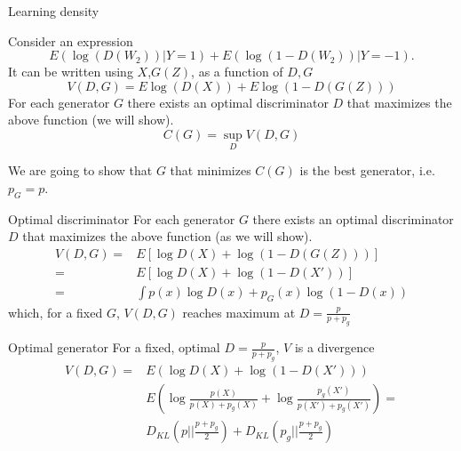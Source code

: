 \documentclass{beamer}
\begin{document}
  
\begin{frame}{Learning density}

Consider an expression  
$$
E \left( \log(D(W_2)) | Y=1 \right)  + E \left( \log(1 - D(W_2))| Y=-1  \right).
$$
It can be written using $X$,$G(Z)$, as a function of $D,G$
$$
V(D,G) = E \log(D(X)) + E \log(1 - D(G(Z)))
$$
For each generator  $G$ there exists an optimal  discriminator $D$ that maximizes the above function (we will show). 
$$C(G) = \sup_{D} V(D,G)$$

We are going to show that $G$ that minimizes $C(G)$ is the best generator, i.e. $p_G = p$.
\end{frame}
  
\begin{frame}{Optimal discriminator}
For each generator  $G$ there exists an optimal  discriminator $D$ that maximizes the above function (as we will show).
\begin{align}
V(D,G) =& E \left[ \log D(X) +  \log(1 - D(G(Z)))  \right] \\ 
       =& E\left[  \log D(X) +  \log(1 - D(X')) \right] \\
       =& \int p(x)  \log D(x) +  p_G(x) \log(1 - D(x))
\end{align}
which, for a fixed $G$, $V(D,G)$ reaches  maximum  at $D = \frac{p}{p+p_g}$


\end{frame}
  
  
\begin{frame}{Optimal generator }
For a fixed, optimal $D = \frac{p}{p+p_g} $, $V$ is a divergence 
\begin{align}
V(D,G) =& E \left(  \log D(X) + \log(1 - D(X')) \right) \\ 
&E \left(   \log \frac{p(X)}{p(X)+p_g(X)} + \log \frac{p_g(X')}{p(X')+p_g(X')} \right) =\\
&D_{KL}(p || \frac{p+p_g}{2} ) + D_{KL}(p_g ||  \frac{p+p_g}{2})
\end{align}

\end{frame}  
  
\end{document}
